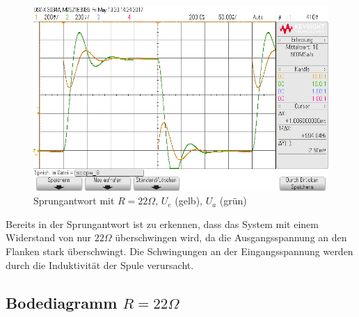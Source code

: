 \begin{figure}[H]
  \begin{center}
    \includegraphics[width=1\textwidth]{./Oszi_Bilder/RLC_Sprung_22.png}
    \caption{Sprungantwort mit $R=22\Omega$, $U_e$ (gelb), $U_a$ (gr\"un)}
  \end{center}
\end{figure}
\noindent
Bereits in der Sprungantwort ist zu erkennen, dass das System mit einem Widerstand von nur $22\Omega$ \"uberschwingen wird, da die Ausgangsspannung an den Flanken stark \"uberschwingt. Die Schwingungen an der Eingangsspannung werden durch die Induktivität der Spule verursacht.

\subsection{Bodediagramm $R=22\Omega$}

